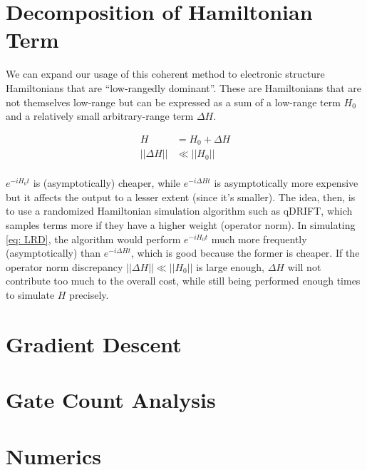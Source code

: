 \section{Decomposition of Hamiltonian Term}

We can expand our usage of this coherent method to electronic structure Hamiltonians that are ``low-rangedly dominant''. These are Hamiltonians that are not themselves low-range but can be expressed as a sum of a low-range term $H_0$ and a relatively small arbitrary-range term $\Delta H$.

\begin{equation}
    \begin{split}
        H &= H_0 + \Delta H \\
        ||\Delta H|| &\ll ||H_0|| \\
    \end{split}
    \label{eq: LRD}
\end{equation}

$e^{-iH_0t}$ is (asymptotically) cheaper, while $e^{-i\Delta Ht}$ is asymptotically more expensive but it affects the output to a lesser extent (since it's smaller). The idea, then, is to use a randomized Hamiltonian simulation algorithm such as qDRIFT, which samples terms more if they have a higher weight (operator norm). In simulating \eqref{eq: LRD}, the algorithm would perform $e^{-iH_0t}$ much more frequently (asymptotically) than $e^{-i\Delta Ht}$, which is good because the former is cheaper. If the operator norm discrepancy $||\Delta H|| \ll ||H_0||$ is large enough, $\Delta H$ will not contribute too much to the overall cost, while still being performed enough times to simulate $H$ precisely.


\section{Gradient Descent}
\section{Gate Count Analysis}
\section{Numerics}



